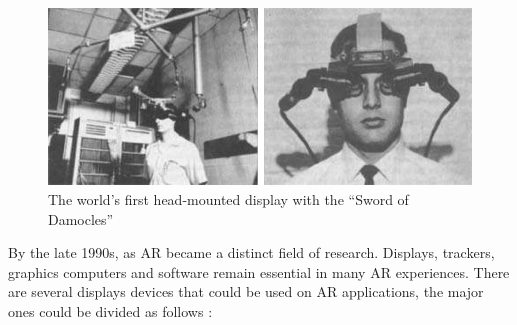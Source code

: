 \begin{figure}[!htb]
  \centering
  \includegraphics[width=\linewidth]{chapters/basic_concepts/first_head_mount.png}
  \caption{The world's first head-mounted display with the ``Sword of Damocles''}
  \label{figure:first_head_mount}
\end{figure}

By the late 1990s, as AR became a distinct field of research. Displays, trackers, graphics computers and software remain essential in many AR experiences. There are several displays devices that could be used on AR applications, the major ones could be divided as follows \cite{Benford1998}:

